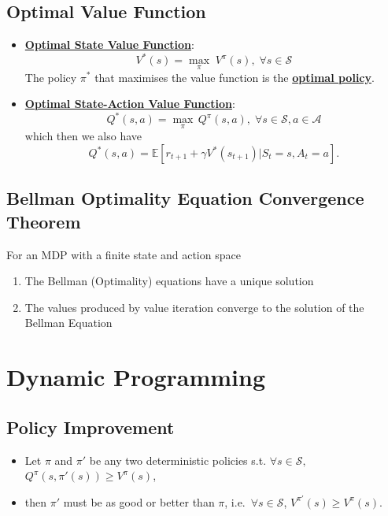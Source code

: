 \documentclass[twocolumn,landscape,10pt]{article}
\theoremstyle{definition}
\begin{document}
\subsection{Optimal Value Function}

\begin{itemize}
    \item \textbf{\underline{Optimal State Value Function}}:
        \[
            V^*(s)=\underset{\pi}{\max}\;V^\pi(s),\;\forall s\in\mathcal{S}
        \]
        The policy $\pi^*$ that maximises the value function is the
        \textbf{\underline{optimal policy}}.
    \item \textbf{\underline{Optimal State-Action Value Function}}:
        \[
            Q^*(s,a)=\underset{\pi}{\max}\,Q^\pi(s,a),\;\forall
            s\in\mathcal{S},a\in\mathcal{A}
        \]
        which then we also have
        \[
            Q^*(s,a)=\mathbb{E}[r_{t+1}+\gamma V^*(s_{t+1})|S_t=s,A_t=a].
        \]
\end{itemize}

\subsection{Bellman Optimality Equation Convergence Theorem}

For an MDP with a finite state and action space
\begin{enumerate}
    \item The Bellman (Optimality) equations have a unique solution
    \item The values produced by value iteration converge to the solution of the
        Bellman Equation
\end{enumerate}

\section{Dynamic Programming}

\subsection{Policy Improvement}

\begin{itemize}
    \item Let $\pi$ and $\pi'$ be any two deterministic policies s.t.
        $\forall s\in\mathcal{S},$ $Q^\pi(s,\pi'(s))\ge V^\pi(s)$,
    \item then $\pi'$ must be as good or better than $\pi$, i.e.\ 
        $\forall s\in\mathcal{S}$, $V^{\pi'}(s)\ge V^\pi(s)$.
\end{itemize}
\end{document}
